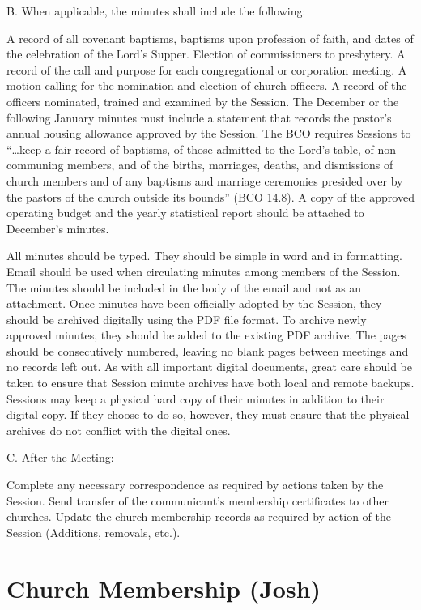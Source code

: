 \documentclass[
]{book}
\begin{document}
B. When applicable, the minutes shall include the following:

A record of all covenant baptisms, baptisms upon profession of faith, and dates of the celebration of the Lord's Supper.
Election of commissioners to presbytery.
A record of the call and purpose for each congregational or corporation meeting.
A motion calling for the nomination and election of church officers.
A record of the officers nominated, trained and examined by the Session.
The December or the following January minutes must include a statement that records the pastor's annual housing allowance approved by the Session.
The BCO requires Sessions to ``\ldots keep a fair record of baptisms, of those admitted to the Lord's table, of non-communing members, and of the births, marriages, deaths, and dismissions of church members and of any baptisms and marriage ceremonies presided over by the pastors of the church outside its bounds'' (BCO 14.8).
A copy of the approved operating budget and the yearly statistical report should be attached to December's minutes.

All minutes should be typed. They should be simple in word and in formatting. Email should be used when circulating minutes among members of the Session. The minutes should be included in the body of the email and not as an attachment. Once minutes have been officially adopted by the Session, they should be archived digitally using the PDF file format. To archive newly approved minutes, they should be added to the existing PDF archive. The pages should be consecutively numbered, leaving no blank pages between meetings and no records left out. As with all important digital documents, great care should be taken to ensure that Session minute archives have both local and remote backups. Sessions may keep a physical hard copy of their minutes in addition to their digital copy. If they choose to do so, however, they must ensure that the physical archives do not conflict with the digital ones.

C. After the Meeting:

Complete any necessary correspondence as required by actions taken by the Session.
Send transfer of the communicant's membership certificates to other churches.
Update the church membership records as required by action of the Session (Additions, removals, etc.).

\hypertarget{church-membership-josh}{%
\chapter{Church Membership (Josh)}\label{church-membership-josh}}
\end{document}
